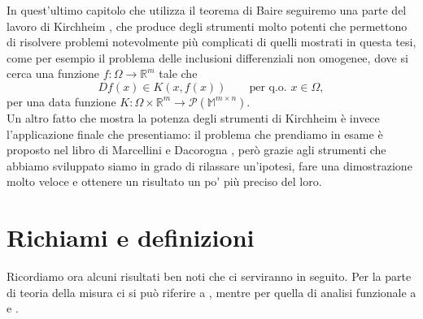 \documentclass[a4paper,11pt]{book}
\theoremstyle{plain}
\theoremstyle{definition}
\theoremstyle{remark}
\newcommand{\R}{\mathbb{R}}
\newcommand{\M}{\mathbb{M}}
\begin{document}
In quest'ultimo capitolo che utilizza il teorema di Baire seguiremo una parte del lavoro di Kirchheim \cite{kirchheim}, che produce degli strumenti molto potenti che permettono di risolvere problemi notevolmente più complicati di quelli mostrati in questa tesi, come per esempio il problema delle inclusioni differenziali non omogenee, dove si cerca una funzione $f:\Omega\to\R^{m}$ tale che
\[
	Df(x)\in K(x,f(x))\qquad \text{per q.o. }x\in \Omega,
\]
per una data funzione $K:\Omega\times\R^{m}\to\mathcal{P}(\M^{m\times n})$.\\
Un altro fatto che mostra la potenza degli strumenti di Kirchheim è invece l'applicazione finale che presentiamo: il problema che prendiamo in esame è proposto nel libro di Marcellini e Dacorogna \cite{marcellini}, però grazie agli strumenti che abbiamo sviluppato siamo in grado di rilassare un'ipotesi, fare una dimostrazione molto veloce e ottenere un risultato un po' più preciso del loro.



\mainmatter
\chapter{Richiami e definizioni}
Ricordiamo ora alcuni risultati ben noti che ci serviranno in seguito. Per la parte di teoria della misura ci si può riferire a \cite{stein}, mentre per quella di analisi funzionale a \cite{brezis} e \cite{buttazzo}.
\end{document}

